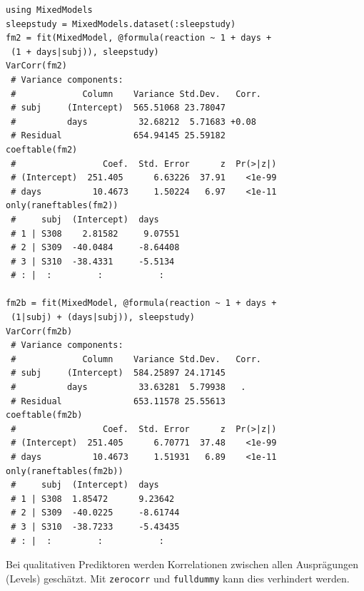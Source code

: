 \documentclass[10pt,twocolumn]{scrartcl}
\begin{document}
\begin{lstlisting}
using MixedModels
sleepstudy = MixedModels.dataset(:sleepstudy)
fm2 = fit(MixedModel, @formula(reaction ~ 1 + days +
 (1 + days|subj)), sleepstudy)
VarCorr(fm2)
 # Variance components:
 #             Column    Variance Std.Dev.   Corr.
 # subj     (Intercept)  565.51068 23.78047
 #          days          32.68212  5.71683 +0.08
 # Residual              654.94145 25.59182
coeftable(fm2)
 #                 Coef.  Std. Error      z  Pr(>|z|)
 # (Intercept)  251.405      6.63226  37.91    <1e-99
 # days          10.4673     1.50224   6.97    <1e-11
only(raneftables(fm2))
 #     subj  (Intercept)  days
 # 1 | S308    2.81582     9.07551
 # 2 | S309  -40.0484     -8.64408
 # 3 | S310  -38.4331     -5.5134
 # : |  :         :           :

fm2b = fit(MixedModel, @formula(reaction ~ 1 + days +
 (1|subj) + (days|subj)), sleepstudy)
VarCorr(fm2b)
 # Variance components:
 #             Column    Variance Std.Dev.   Corr.
 # subj     (Intercept)  584.25897 24.17145
 #          days          33.63281  5.79938   .
 # Residual              653.11578 25.55613
coeftable(fm2b)
 #                 Coef.  Std. Error      z  Pr(>|z|)
 # (Intercept)  251.405      6.70771  37.48    <1e-99
 # days          10.4673     1.51931   6.89    <1e-11
only(raneftables(fm2b))
 #     subj  (Intercept)  days
 # 1 | S308  1.85472      9.23642
 # 2 | S309  -40.0225     -8.61744
 # 3 | S310  -38.7233     -5.43435
 # : |  :         :           :
\end{lstlisting}

Bei qualitativen Prediktoren werden Korrelationen zwischen allen Ausprägungen
(Levels) geschätzt. Mit \lstinline|zerocorr| und \lstinline|fulldummy| kann dies
verhindert werden.
\end{document}
